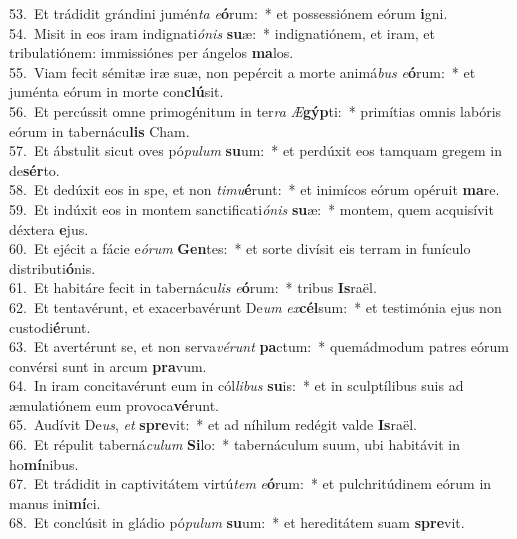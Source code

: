 {53.~}Et trádidit grándini jumén\textit{ta} \textit{e}\textbf{ó}rum:~* et possessiónem eórum \textbf{i}gni.\\
{54.~}Misit in eos iram indignati\textit{ó}\textit{nis} \textbf{su}æ:~* indignatiónem, et iram, et tribulatiónem: immissiónes per ángelos \textbf{ma}los.\\
{55.~}Viam fecit sémitæ iræ suæ, non pepércit a morte animá\textit{bus} \textit{e}\textbf{ó}rum:~* et juménta eórum in morte con\textbf{clú}sit.\\
{56.~}Et percússit omne primogénitum in ter\textit{ra} \textit{Æ}\textbf{gýp}ti:~* primítias omnis labóris eórum in tabernácu\textbf{lis} Cham.\\
{57.~}Et ábstulit sicut oves pó\textit{pu}\textit{lum} \textbf{su}um:~* et perdúxit eos tamquam gregem in de\textbf{sér}to.\\
{58.~}Et dedúxit eos in spe, et non \textit{ti}\textit{mu}\textbf{é}runt:~* et inimícos eórum opéruit \textbf{ma}re.\\
{59.~}Et indúxit eos in montem sanctificati\textit{ó}\textit{nis} \textbf{su}æ:~* montem, quem acquisívit déxtera \textbf{e}jus.\\
{60.~}Et ejécit a fácie e\textit{ó}\textit{rum} \textbf{Gen}tes:~* et sorte divísit eis terram in funículo distributi\textbf{ó}nis.\\
{61.~}Et habitáre fecit in tabernácu\textit{lis} \textit{e}\textbf{ó}rum:~* tribus \textbf{Is}raël.\\
{62.~}Et tentavérunt, et exacerbavérunt De\textit{um} \textit{ex}\textbf{cél}sum:~* et testimónia ejus non custodi\textbf{é}runt.\\
{63.~}Et avertérunt se, et non serva\textit{vé}\textit{runt} \textbf{pa}ctum:~* quemádmodum patres eórum convérsi sunt in arcum \textbf{pra}vum.\\
{64.~}In iram concitavérunt eum in cól\textit{li}\textit{bus} \textbf{su}is:~* et in sculptílibus suis ad æmulatiónem eum provoca\textbf{vé}runt.\\
{65.~}Audívit De\textit{us}, \textit{et} \textbf{spre}vit:~* et ad níhilum redégit valde \textbf{Is}raël.\\
{66.~}Et répulit taberná\textit{cu}\textit{lum} \textbf{Si}lo:~* tabernáculum suum, ubi habitávit in ho\textbf{mí}nibus.\\
{67.~}Et trádidit in captivitátem virtú\textit{tem} \textit{e}\textbf{ó}rum:~* et pulchritúdinem eórum in manus ini\textbf{mí}ci.\\
{68.~}Et conclúsit in gládio pó\textit{pu}\textit{lum} \textbf{su}um:~* et hereditátem suam \textbf{spre}vit.\\
